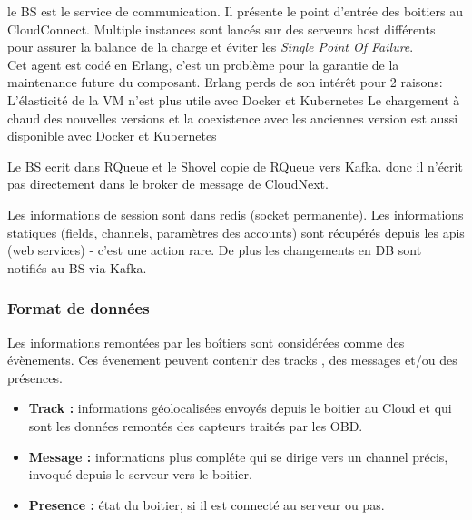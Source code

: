         le \gls{BS} est le service de communication. Il présente le point d'entrée des boitiers au CloudConnect. 
            Multiple instances sont lancés sur des serveurs host différents pour assurer la balance de la charge 
            et éviter les \textit{Single Point Of Failure}. \\
        Cet agent est codé en Erlang, c’est un problème pour la garantie de la maintenance future du composant.
        Erlang perds de son intérêt pour 2 raisons:
            L'élasticité de la VM n’est plus utile avec Docker et Kubernetes
            Le chargement à chaud des nouvelles versions et la coexistence avec les anciennes version est aussi 
            disponible avec Docker et Kubernetes

        Le BS ecrit dans RQueue et le Shovel copie de RQueue vers Kafka. donc il n'écrit pas directement dans le broker de message de CloudNext.


        Les informations de session sont dans redis (socket permanente).
        Les informations statiques (fields, channels, paramètres des accounts) sont récupérés depuis les apis (web services) - c’est une action rare.
        De plus les changements en DB sont notifiés au BS via Kafka.

        \subsubsection{Format de données}
        Les informations remontées par les boîtiers sont considérées comme des évènements. Ces évenement peuvent contenir 
        des tracks , des messages et/ou des présences.\\
        \begin{itemize}
            \renewcommand{\labelitemi}{$\bullet$}
            \item \textbf{Track :} informations géolocalisées envoyés depuis le boitier au Cloud et qui sont les données remontés des capteurs traités par les OBD. \\
            \item \textbf{Message :} informations plus compléte qui se dirige vers un channel précis, invoqué depuis le serveur vers le boitier.\\
            \item \textbf{Presence :} état du boitier, si il est connecté au serveur ou pas.\\
        \end{itemize}

